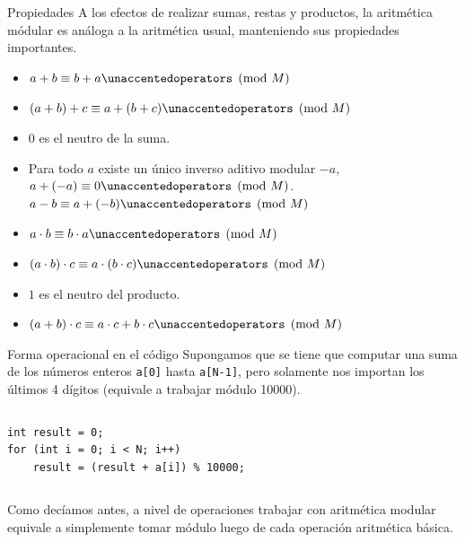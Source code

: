 \documentclass{beamer}
\begin{document}
\begin{frame}{Propiedades}
    A los efectos de realizar sumas, restas y productos, la aritmética módular es análoga a la aritmética usual, manteniendo sus propiedades importantes.
  \begin{itemize}
       \item $a+b \equiv b+a \modulo{M}$
       \item $(a+b)+c \equiv a+(b+c) \modulo{M}$
       \item $0$ es el neutro de la suma.
       \item Para todo $a$ existe un único inverso aditivo modular $-a$, $a + (-a) \equiv  0 \modulo{M}$. $a-b  \equiv  a + (-b) \modulo{M}$
       \item $a \cdot b \equiv b \cdot a \modulo{M}$
       \item $(a \cdot b) \cdot c \equiv a \cdot (b \cdot c) \modulo{M}$
       \item $1$ es el neutro del producto.
       \item $(a+b) \cdot c \equiv a \cdot c + b \cdot c \modulo{M}$
  \end{itemize}
\end{frame}


\begin{frame}[fragile]{Forma operacional en el código}
Supongamos que se tiene que computar una suma de los números enteros \texttt{a[0]} hasta \texttt{a[N-1]}, pero solamente nos importan los últimos 4 dígitos (equivale a trabajar módulo 10000).

\begin{columns}
\begin{column}{0.65\textwidth}
\begin{lstlisting}
int result = 0;
for (int i = 0; i < N; i++)
    result = (result + a[i]) % 10000;
\end{lstlisting}
\end{column}
\end{columns}

Como decíamos antes, a nivel de operaciones trabajar con aritmética modular equivale a simplemente tomar módulo luego de cada operación aritmética básica.

\end{frame}
\end{document}

